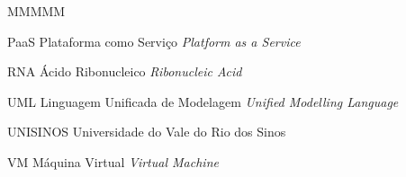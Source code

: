 \documentclass[english,brazilian]{UNISINOSmonografia} %
\begin{document}
\begin{listadesiglas}{MMMMM}
	\item[PaaS] Plataforma como Serviço \newline \textit{Platform as a Service}
	\item[RNA] Ácido Ribonucleico \newline \textit{Ribonucleic Acid}
	\item[UML] Linguagem Unificada de Modelagem \newline \textit{Unified Modelling Language}
	\item[UNISINOS] Universidade do Vale do Rio dos Sinos
	\item[VM] Máquina Virtual \newline \textit{Virtual Machine}
\end{listadesiglas}

%
\end{document}

